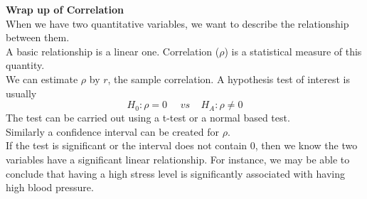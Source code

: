 \newpage

\Large\textbf{Wrap up of Correlation}\large\\
When we have two quantitative variables, we want to describe the relationship between them.\\

A basic relationship is a linear one.  Correlation ($\rho$) is a statistical measure of this quantity.\\

We can estimate $\rho$ by $r$, the sample correlation.  A hypothesis test of interest is usually
$$H_0:\rho=0~~~~~~vs~~~~~H_A:\rho\neq0$$
The test can be carried out using a t-test or a normal based test.\\

Similarly a confidence interval can be created for $\rho$.\\

If the test is significant or the interval does not contain 0, then we know the two variables have a significant linear relationship. For instance, we may be able to conclude that having a high stress level is significantly associated with having high blood pressure.\\~\\~\\~\\~\\


